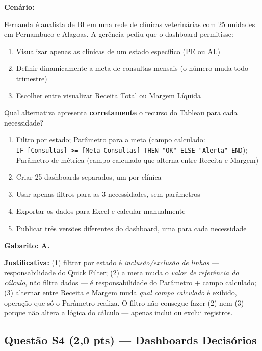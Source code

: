 \begin{SolvedBox}
\textbf{Cenário:}

Fernanda é analista de BI em uma rede de clínicas veterinárias com 25 unidades em
Pernambuco e Alagoas. A gerência pediu que o dashboard permitisse:
\begin{enumerate}
  \item Visualizar apenas as clínicas de um estado específico (PE ou AL)
  \item Definir dinamicamente a meta de consultas mensais (o número muda todo trimestre)
  \item Escolher entre visualizar Receita Total ou Margem Líquida
\end{enumerate}

Qual alternativa apresenta \textbf{corretamente} o recurso do Tableau para cada necessidade?

\begin{enumerate}[label=\Alph*)]
  \item Filtro por estado; Parâmetro para a meta (campo calculado: \\
  \texttt{IF [Consultas] >= [Meta Consultas] THEN "OK" ELSE "Alerta" END}); \\
  Parâmetro de métrica (campo calculado que alterna entre Receita e Margem)
  \item Criar 25 dashboards separados, um por clínica
  \item Usar apenas filtros para as 3 necessidades, sem parâmetros
  \item Exportar os dados para Excel e calcular manualmente
  \item Publicar três versões diferentes do dashboard, uma para cada necessidade
\end{enumerate}

\medskip
\textbf{Gabarito: A.}

\textbf{Justificativa:} (1) filtrar por estado é \emph{inclusão/exclusão de linhas} —
responsabilidade do Quick Filter; (2) a meta muda o \emph{valor de referência do cálculo},
não filtra dados — é responsabilidade do Parâmetro + campo calculado; (3) alternar
entre Receita e Margem muda \emph{qual campo calculado} é exibido, operação que só o
Parâmetro realiza. O filtro não consegue fazer (2) nem (3) porque não altera a lógica
do cálculo — apenas inclui ou exclui registros.
\end{SolvedBox}

\subsection*{Questão S4 (2,0 pts) — Dashboards Decisórios}

